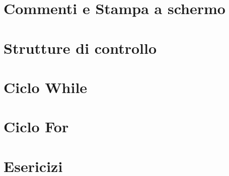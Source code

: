 \documentclass[10pt]{beamer}
\begin{document}




\section{Commenti e Stampa a schermo}


\section{Strutture di controllo}


\section{Ciclo While}


\section{Ciclo For}


\section{Esericizi}

% 
\end{document}
